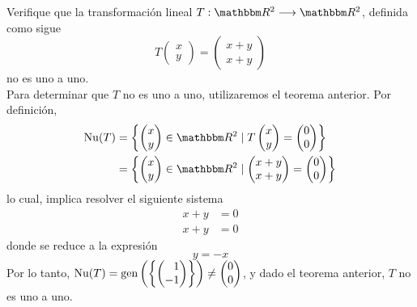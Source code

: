 \begin{example}
    Verifique que la transformación lineal $T:\RR[2] \longrightarrow \RR[2]$, definida como sigue
    $$T \begin{pmatrix}
        x \\
        y
    \end{pmatrix} = \begin{pmatrix}
        x + y \\
        x + y
    \end{pmatrix}$$
    no es uno a uno. \\
    \solucion Para determinar que $T$ no es uno a uno, utilizaremos el teorema anterior. Por definición,
    \begin{align*}
        \Nuc(T) & = \left\{ \begin{pmatrix}
            x \\
            y
        \end{pmatrix} \in \RR[2] \mid T\begin{pmatrix}
            x \\
            y
        \end{pmatrix} = \begin{pmatrix}
            0 \\
            0
        \end{pmatrix} \right\} \\
        & = \left\{ \begin{pmatrix}
            x \\
            y
        \end{pmatrix} \in \RR[2] \mid \begin{pmatrix}
            x + y \\
            x + y
        \end{pmatrix} = \begin{pmatrix}
            0 \\
            0
        \end{pmatrix} \right\}
    \end{align*}
    lo cual, implica resolver el siguiente sistema
    \begin{align*}
        x + y & = 0 \\
        x + y & = 0
    \end{align*}
    donde se reduce a la expresión
    $$y = - x$$
    Por lo tanto, $\displaystyle \Nuc(T) = \Gen \left( \left\{ \begin{pmatrix*}[r]
        1 \\
        -1
    \end{pmatrix*} \right\} \right) \neq \begin{pmatrix}
        0 \\
        0
    \end{pmatrix}$, y dado el teorema anterior, $T$ no es uno a uno.
\end{example}

